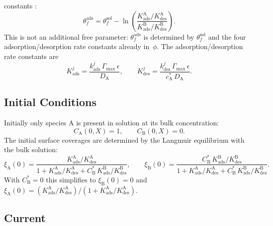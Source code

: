 constants \cite{compton2014understanding}:
\begin{equation}\label{eq:ads-thetaf-relation}
  \theta_f^{\mathrm{ads}} = \theta_f^{\mathrm{sol}}
  - \ln\!\left(
    \frac{K_{\mathrm{ads}}^{\mathrm{A}} / K_{\mathrm{des}}^{\mathrm{A}}}
    {K_{\mathrm{ads}}^{\mathrm{B}} / K_{\mathrm{des}}^{\mathrm{B}}}
  \right).
\end{equation}
This is not an additional free parameter: $\theta_f^{\mathrm{ads}}$ is
determined by $\theta_f^{\mathrm{sol}}$ and the four
adsorption/desorption rate constants already in~$\phi$.
The adsorption/desorption rate constants are
\begin{equation}\label{eq:ads-kads-kdes}
  K_{\mathrm{ads}}^{j}
  = \frac{k_{\mathrm{ads}}^{j}\,\Gamma_{\mathrm{max}}\,\epsilon}
  {D_\mathrm{A}},
  \qquad
  K_{\mathrm{des}}^{j}
  = \frac{k_{\mathrm{des}}^{j}\,\Gamma_{\mathrm{max}}\,\epsilon}
  {c_\mathrm{A}^*\,D_\mathrm{A}}.
\end{equation}

\subsection{Initial Conditions}

Initially only species $\mathrm{A}$ is present in solution at its bulk
concentration:
\begin{equation}\label{eq:ads-ic-conc}
  C_\mathrm{A}(0, X) = 1, \qquad C_\mathrm{B}(0, X) = 0.
\end{equation}
The initial surface coverages are determined by the Langmuir equilibrium
with the bulk solution:
\begin{equation}\label{eq:ads-ic-coverage}
  \xi_\mathrm{A}(0) =
  \frac{K_{\mathrm{ads}}^{\mathrm{A}} / K_{\mathrm{des}}^{\mathrm{A}}}
  {1 + K_{\mathrm{ads}}^{\mathrm{A}} / K_{\mathrm{des}}^{\mathrm{A}}
    + C_\mathrm{B}^*\, K_{\mathrm{ads}}^{\mathrm{B}} /
  K_{\mathrm{des}}^{\mathrm{B}}},
  \qquad
  \xi_\mathrm{B}(0) =
  \frac{C_\mathrm{B}^*\, K_{\mathrm{ads}}^{\mathrm{B}} /
  K_{\mathrm{des}}^{\mathrm{B}}}
  {1 + K_{\mathrm{ads}}^{\mathrm{A}} / K_{\mathrm{des}}^{\mathrm{A}}
    + C_\mathrm{B}^*\, K_{\mathrm{ads}}^{\mathrm{B}} /
  K_{\mathrm{des}}^{\mathrm{B}}}.
\end{equation}
With $C_\mathrm{B}^* = 0$ this simplifies to
$\xi_\mathrm{B}(0) = 0$ and
$\xi_\mathrm{A}(0) = (K_{\mathrm{ads}}^{\mathrm{A}} /
K_{\mathrm{des}}^{\mathrm{A}}) / (1 +
K_{\mathrm{ads}}^{\mathrm{A}} / K_{\mathrm{des}}^{\mathrm{A}})$.

\subsection{Current}

